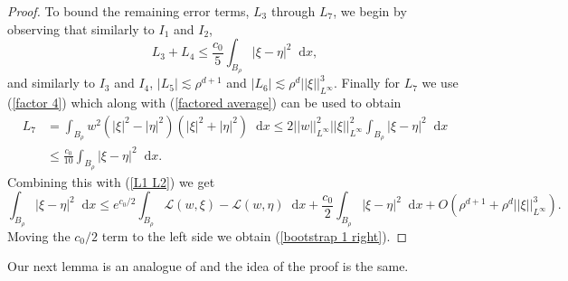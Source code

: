 \documentclass[reqno,10pt]{amsart}
\newcommand*\dif{\mathop{}\!\mathrm{d}}
\newcommand{\Lagrange}{\mathscr L}
\theoremstyle{definition}
\numberwithin{equation}{section}
\begin{document}
\begin{proof}
To bound the remaining error terms, $L_3$ through $L_7$, we begin by observing that similarly to $I_1$ and $I_2$,
$$L_3 + L_4 \leq \frac{c_0}{5} \int_{B_\rho} |\xi - \eta|^2 \dif x,$$
and similarly to $I_3$ and $I_4$, $|L_5| \lesssim \rho^{d + 1}$ and $|L_6| \lesssim \rho^d ||\xi||_{L^\infty}^3$.
Finally for $L_7$ we use (\ref{factor 4}) which along with (\ref{factored average}) can be used to obtain 
\begin{align*}
L_7 &= \int_{B_\rho} w^2 (|\xi|^2 - |\eta|^2)(|\xi|^2 + |\eta|^2) \dif x \leq 2||w||_{L^\infty}^2 ||\xi||_{L^\infty}^2 \int_{B_\rho} |\xi - \eta|^2 \dif x \\
&\leq \frac{c_0}{10} \int_{B_\rho} |\xi - \eta|^2 \dif x.
\end{align*}
Combining this with (\ref{L1 L2}) we get 
$$\int_{B_\rho} |\xi - \eta|^2 \dif x \leq e^{c_0/2} \int_{B_\rho} \Lagrange(w, \xi) - \Lagrange(w, \eta) \dif x + \frac{c_0}{2} \int_{B_\rho} |\xi - \eta|^2 \dif x + O(\rho^{d + 1} + \rho^d ||\xi||_{L^\infty}^3).$$
Moving the $c_0/2$ term to the left side we obtain (\ref{bootstrap 1 right}).
\end{proof}

Our next lemma is an analogue of \cite[Teorema 4.3]{Miranda66} and the idea of the proof is the same.
\end{document}
